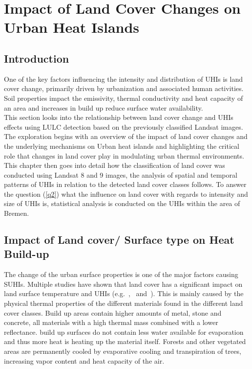 \documentclass[12pt,a4paper, english,twoside]{article}
\begin{document}
\section{Impact of Land Cover Changes on Urban Heat Islands}\label{sec:LULC}
    \subsection{Introduction}
      One of the key factors influencing the intensity and distribution of \glspl{UHI} is land cover change, primarily driven by urbanization and associated human activities.
      Soil properties impact the emissivity, thermal conductivity and heat capacity of an area and increases in build up reduce surface water availability. 
      \\    
      This section looks into the relationship between land cover change and \glspl{UHI} effects using \gls{LULC} detection based on the previously classified Landsat images.
      The exploration begins with an overview of the impact of land cover changes and the underlying mechanisms on Urban heat islands and highlighting the critical role that changes in land cover play in modulating urban thermal environments.
      \\
      This chapter then goes into detail how the classification of land cover was conducted using Landsat 8 and 9 images, the analysis of spatial and temporal patterns of \glspl{UHI} in relation to the detected land cover classes follows.
      To answer the question (\cref{q2}) what the influence on land cover with regards to intensity and size of \glspl{UHI} is, statistical analysis is conducted on the \glspl{UHI} within the area of Bremen. \\
    \subsection{Impact of Land cover/ Surface type on Heat Build-up}
      The change of the urban surface properties is one of the major factors causing \glspl{SUHI}.  
      Multiple studies have shown that land cover has a significant impact on land surface temperature and \glspl{UHI} (e.g.~\cite{Karakus2019},~\cite{Weng2004} and~\cite{Stewart2011}). 
      This is mainly caused by the physical thermal properties of the different materials found in the different land cover classes. 
      Build up areas contain higher amounts of metal, stone and concrete, all materials with a high thermal mass combined with a lower reflectance.  
      build up surfaces do not contain less water available for evaporation and thus more heat is heating up the material itself.
      Forests and other vegetated areas are permanently cooled by evaporative cooling and transpiration of trees, increasing vapor content and heat capacity of the air.
\end{document}
